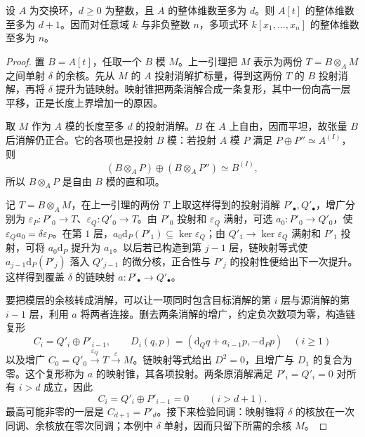 \begin{proposition}\label{b3:prop:polynomial-global-bound}
	设 \(A\) 为交换环，\(d\ge0\) 为整数，且 \(A\) 的整体维数至多为 \(d\)。则 \(A[t]\) 的整体维数至多为 \(d+1\)。因而对任意域 \(k\) 与非负整数 \(n\)，多项式环 \(k[x_1,\ldots,x_n]\) 的整体维数至多为 \(n\)。
\end{proposition}
\begin{proof}
	置 \(B=A[t]\)，任取一个 \(B\) 模 \(M\)。上一引理把 \(M\) 表示为两份 \(T=B\otimes_AM\) 之间单射 \(\delta\) 的余核。先从 \(M\) 的 \(A\) 投射消解扩标量，得到这两份 \(T\) 的 \(B\) 投射消解，再将 \(\delta\) 提升为链映射。映射锥把两条消解合成一条复形，其中一份向高一层平移，正是长度上界增加一的原因。

	取 \(M\) 作为 \(A\) 模的长度至多 \(d\) 的投射消解。\(B\) 在 \(A\) 上自由，因而平坦，故张量 \(B\) 后消解仍正合。它的各项也是投射 \(B\) 模：若投射 \(A\) 模 \(P\) 满足 \(P\oplus P''\simeq A^{(I)}\)，则
	\[
		(B\otimes_AP)\oplus(B\otimes_AP'')\simeq B^{(I)},
	\]
	所以 \(B\otimes_AP\) 是自由 \(B\) 模的直和项。

	记 \(T=B\otimes_AM\)，在上一引理的两份 \(T\) 上取这样得到的投射消解 \(P'_\bullet,Q'_\bullet\)，增广分别为 \(\varepsilon_P:P'_0\rightarrow T\)、\(\varepsilon_Q:Q'_0\rightarrow T\)。由 \(P'_0\) 投射和 \(\varepsilon_Q\) 满射，可选 \(a_0:P'_0\rightarrow Q'_0\)，使 \(\varepsilon_Qa_0=\delta\varepsilon_P\)。在第 \(1\) 层，\(a_0\mathrm{d}_P(P'_1)\subseteq\ker\varepsilon_Q\)；由 \(Q'_1\rightarrow\ker\varepsilon_Q\) 满射和 \(P'_1\) 投射，可将 \(a_0\mathrm{d}_P\) 提升为 \(a_1\)。以后若已构造到第 \(j-1\) 层，链映射等式使 \(a_{j-1}\mathrm{d}_P(P'_j)\) 落入 \(Q'_{j-1}\) 的微分核，正合性与 \(P'_j\) 的投射性便给出下一次提升。这样得到覆盖 \(\delta\) 的链映射 \(a:P'_\bullet\rightarrow Q'_\bullet\)。

	要把模层的余核转成消解，可以让一项同时包含目标消解的第 \(i\) 层与源消解的第 \(i-1\) 层，利用 \(a\) 将两者连接。删去两条消解的增广，约定负次数项为零，构造链复形
	\[
		C_i=Q'_i\oplus P'_{i-1},\qquad D_i(q,p)=(\mathrm{d}_Qq+a_{i-1}p,-\mathrm{d}_Pp)\quad(i\ge1)
	\]
	以及增广 \(C_0=Q'_0\xrightarrow{\varepsilon_Q}T\xrightarrow{\varepsilon}M\)。链映射等式给出 \(D^2=0\)，且增广与 \(D_1\) 的复合为零。这个复形称为 \(a\) 的映射锥，其各项投射。两条原消解满足 \(P'_i=Q'_i=0\) 对所有 \(i>d\) 成立，因此
	\[
		C_i=Q'_i\oplus P'_{i-1}=0\qquad(i>d+1).
	\]
	最高可能非零的一层是 \(C_{d+1}=P'_d\)。接下来检验同调：映射锥将 \(\delta\) 的核放在一次同调、余核放在零次同调；本例中 \(\delta\) 单射，因而只留下所需的余核 \(M\)。


\end{proof}
